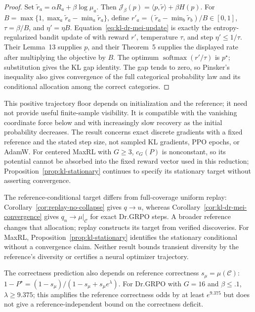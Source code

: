 \begin{proof}
\enforcehalffinalproseline
Set $\widetilde r_a=\alpha R_a+\beta\log\mu_a$. Then
$\mathcal J_\beta(p)=\langle p,\widetilde r\rangle+\beta H(p)$.
For $B=\max\{1,\max_a\widetilde r_a-\min_a\widetilde r_a\}$, define
$r'_a=(\widetilde r_a-\min_b\widetilde r_b)/B\in[0,1]$,
$\tau=\beta/B$, and $\eta'=\eta B$. Equation~\eqref{eq:kl-dr-mei-update}
is exactly the entropy-regularized bandit update of
\citet{mei2020softmaxpg} with reward $r'$, temperature $\tau$, and step
$\eta'\le1/\tau$. Their Lemma~13 supplies $\underline p$, and their
Theorem~5 supplies the displayed rate after multiplying the objective by
$B$. The optimum $\operatorname{softmax}(r'/\tau)$ is $p^\star$;
substitution gives the KL gap identity. The gap tends to zero, so Pinsker's
inequality also gives convergence of the full categorical probability law
and its conditional allocation among the correct categories.
\end{proof}

This positive trajectory floor depends on initialization and the reference;
it need not provide useful finite-sample visibility. It is compatible with
the vanishing coordinate force below and with increasingly slow recovery
as the initial probability decreases. The result concerns exact discrete
gradients with a fixed reference and the stated step size, not sampled KL
gradients, PPO epochs, or AdamW. For centered MaxRL with $G\ge3$,
$c_G(P)$ is nonconstant, so its potential cannot be absorbed into the fixed
reward vector used in this reduction; Proposition~\ref{prop:kl-stationary}
continues to specify its stationary target without asserting convergence.


The reference-conditional target differs from full-coverage uniform replay:
Corollary~\ref{cor:replay-no-collapse} gives $q\to u$, whereas
Corollary~\ref{cor:kl-dr-mei-convergence} gives $q_n\to\mu|_{\mathcal C}$
for exact Dr.GRPO steps. A broader reference changes that allocation;
replay constructs its target from verified discoveries. For MaxRL,
Proposition~\ref{prop:kl-stationary} identifies the stationary conditional
without a convergence claim. Neither result bounds transient diversity by
the reference's diversity or certifies a neural optimizer trajectory.

\begin{remark}
The correctness prediction also depends on reference correctness
$s_\mu=\mu(\mathcal C)$:
$1-P^\star=(1-s_\mu)/(1-s_\mu+s_\mu e^\lambda)$.
For Dr.GRPO with $G=16$ and $\beta\le.1$, $\lambda\ge9.375$;
this amplifies the reference correctness odds by at least $e^{9.375}$ but
does not give a reference-independent bound on the correctness deficit.
\end{remark}

